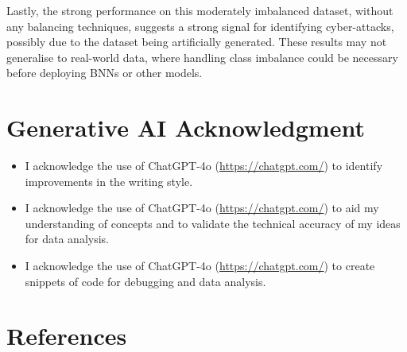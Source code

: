 \documentclass[
  a4paper,
]{scrreprt}
\begin{document}
Lastly, the strong performance on this moderately imbalanced dataset,
without any balancing techniques, suggests a strong signal for
identifying cyber-attacks, possibly due to the dataset being
artificially generated. These results may not generalise to real-world
data, where handling class imbalance could be necessary before deploying
BNNs or other models.


\chapter*{Generative AI
Acknowledgment}\label{generative-ai-acknowledgment}


\begin{itemize}
\item
  I acknowledge the use of ChatGPT-4o (\url{https://chatgpt.com/}) to
  identify improvements in the writing style.
\item
  I acknowledge the use of ChatGPT-4o (\url{https://chatgpt.com/}) to
  aid my understanding of concepts and to validate the technical
  accuracy of my ideas for data analysis.
\item
  I acknowledge the use of ChatGPT-4o (\url{https://chatgpt.com/}) to
  create snippets of code for debugging and data analysis.
\end{itemize}


\chapter*{References}\label{references}

\end{document}
